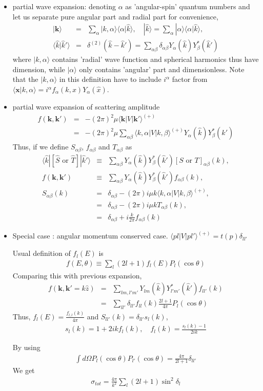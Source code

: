 \documentclass[10pt]{article}
\def\bm{\boldsymbol}
\newcommand{\bea}{\begin{eqnarray}}
\newcommand{\eea}{\end{eqnarray}}
\newcommand{\no}{\nonumber \\}
\def\vk{{\bm k}}
\def\vx{{\bm x}}
\def\la{\langle}
\def\ra{\rangle}
\begin{document}
\begin{itemize}
\item partial wave expansion: denoting $\alpha$ as
'angular-spin' quantum numbers and let us separate pure angular part
and radial part for convenience,
\bea
|\vk\ra&=&\sum_\alpha |k, \alpha\ra  
                \la \alpha|\hat{k}\ra
,\quad 
|\hat{k}\ra = \sum_{\alpha}|\alpha\ra \la \alpha|\hat{k}\ra,\no
\la \hat{k}|\hat{k}'\ra&=&\delta^{(2)}(\hat{k}-\hat{k}')
 =\sum_{\alpha\beta}\delta_{\alpha\beta} 
  Y_{\alpha}(\hat{k})Y_{\beta}^*(\hat{k}')
\eea
where $|k,\alpha\ra$ contains 'radial' wave function
and spherical harmonics 
thus have dimension,
while $|\alpha\ra$ only contains 'angular' part
and dimensionless.
Note that the $|k,\alpha\ra$ in this definition 
have to include $i^\alpha$ factor from
$\la \vx|k,\alpha\ra= i^\alpha f_\alpha(k,x) Y_\alpha(\hat{x})$.


\item partial wave expansion of scattering amplitude
\bea
f(\vk,\vk')&=&-(2\pi)^2\mu \la \vk|V|\vk'\ra^{(+)}\no
           &=&-(2\pi)^2\mu \sum_{\alpha\beta} 
        \la k,\alpha| V| k,\beta\ra^{(+)}
        Y_{\alpha}(\hat{k})Y_{\beta}^*(\hat{k}')   
\eea
Thus, if we define $S_{\alpha\beta}$, $f_{\alpha\beta}$ and
$T_{\alpha\beta}$ as
\bea
\la \hat{k}|
[\hat{S}\mbox{ or }\hat{T}]   |\hat{k}'\ra&\equiv&\sum_{\alpha\beta}
      Y_{\alpha}(\hat{k})Y_{\beta}^*(\hat{k}') 
      [S\mbox{ or } T]_{\alpha\beta}(k),\no
f(\vk,\vk')&\equiv&\sum_{\alpha\beta}
      Y_{\alpha}(\hat{k})Y_{\beta}^*(\hat{k}') f_{\alpha\beta}(k),\no
S_{\alpha\beta}(k)
&=&\delta_{\alpha\beta}-(2\pi)i \mu k 
        \la k,\alpha| V| k,\beta\ra^{(+)},\no
&=&\delta_{\alpha\beta} -(2\pi)i \mu k T_{\alpha\beta}(k),\no
&=&\delta_{\alpha\beta}+ i\frac{k}{2\pi} f_{\alpha\beta}(k)             
\eea

\item Special case : angular momentum conserved case.
 $\la pl|V|pl'\ra^{(+)}=t(p)\delta_{ll'}$

Usual definition of $f_l(E)$ is
\bea
f(E,\theta)\equiv\sum_{l}(2l+1)f_l(E)P_l(\cos\theta)
\eea
Comparing this with previous expansion,
\bea
f(\vk,\vk'=k \hat{z}) &=&\sum_{lm, l' m'} 
         Y_{lm}(\hat{k})Y^*_{l'm'}(\hat{k}')
         f_{l l'}(k)\no
    &=&\sum_{ll'} \delta_{ll'} f_{ll}(k)
           \frac{2l+1}{4\pi}P_l(\cos\theta)
\eea
Thus, $f_l(E)=\frac{f_{l,l}(k)}{4\pi}$ and $S_{ll'}(k)=\delta_{ll'}s_l(k)$,
\bea
s_l(k)=1+2ik f_l(k), \quad f_l(k)=\frac{s_l(k)-1}{2ik}
\eea

By using 
\bea
\int d\Omega P_l(\cos\theta)P_{l'}(\cos\theta)=\frac{4\pi}{2l+1}\delta_{ll'}
\eea
We get
\bea
\sigma_{tot}=\frac{4\pi}{k^2}\sum_l (2l+1)\sin^2\delta_l
\eea
\end{itemize}
\end{document}

